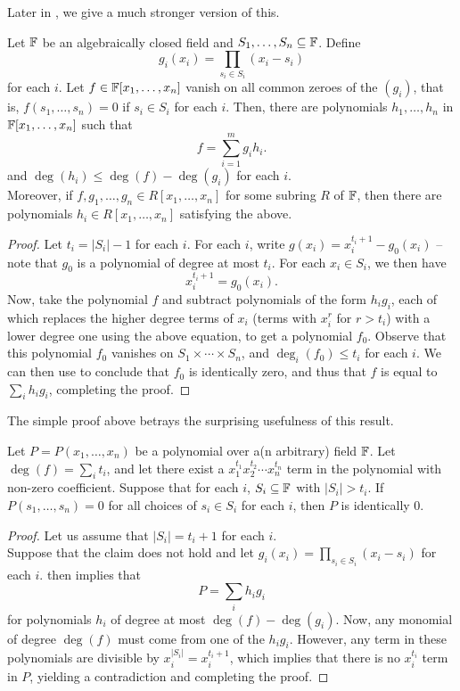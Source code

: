 	Later in , we give a much stronger version of this.

	\begin{ftheo}
		\label{thm: comb null}
		Let $\mathbb{F}$ be an algebraically closed field and $S_1,\ldots,S_n \subseteq \mathbb{F}$. Define
		\[ g_i(x_i) = \prod_{s_i \in S_i} (x_i - s_i) \]
		for each $i$. Let $f \in \mathbb{F}[x_1,\ldots,x_n]$ vanish on all common zeroes of the $(g_i)$, that is, $f(s_1,\ldots,s_n) = 0$ if $s_i \in S_i$ for each $i$. Then, there are polynomials $h_1,\ldots,h_n$ in $\mathbb{F}[x_1,\ldots,x_n]$ such that
		\[ f = \sum_{i=1}^{m} g_i h_i. \]
		and $\deg(h_i) \le \deg(f) - \deg(g_i)$ for each $i$.\\
		Moreover, if $f,g_1,\ldots,g_n \in R[x_1,\ldots,x_n]$ for some subring $R$ of $\mathbb{F}$, then there are polynomials $h_i \in R[x_1,\ldots,x_n]$ satisfying the above.
	\end{ftheo}
	\begin{proof}
		Let $t_i = |S_i| - 1$ for each $i$. For each $i$, write $g(x_i) = x_i^{t_i+1} - g_0(x_i)$ -- note that $g_0$ is a polynomial of degree at most $t_i$. For each $x_i \in S_i$, we then have
		\[ x_i^{t_i + 1} = g_0(x_i). \]
		Now, take the polynomial $f$ and subtract polynomials of the form $h_i g_i$, each of which replaces the higher degree terms of $x_i$ (terms with $x_i^{r}$ for $r > t_i$) with a lower degree one using the above equation, to get a polynomial $f_0$. Observe that this polynomial $f_0$ vanishes on $S_1 \times \cdots \times S_n$, and $\deg_i(f_0) \le t_i$ for each $i$. We can then use  to conclude that $f_0$ is identically zero, and thus that $f$ is equal to $\sum_i h_i g_i$, completing the proof.
	\end{proof}

	The simple proof above betrays the surprising usefulness of this result.

	\begin{fcor}
		\label{thm: cube-vanishing}
		Let $P = P(x_1,\ldots,x_n)$ be a polynomial over a(n arbitrary) field $\mathbb{F}$. Let $\deg(f) = \sum_i t_i$, and let there exist a $x_1^{t_1} x_2^{t_2} \cdots x_n^{t_n}$ term in the polynomial with non-zero coefficient. Suppose that for each $i$, $S_i \subseteq \mathbb{F}$ with $|S_i| > t_i$. If $P(s_1,\ldots,s_n) = 0$ for all choices of $s_i \in S_i$ for each $i$, then $P$ is identically $0$. 
	\end{fcor}
	\begin{proof}
		Let us assume that $|S_i| = t_i + 1$ for each $i$.\\
		Suppose that the claim does not hold and let $g_i(x_i) = \prod_{s_i \in S_i} (x_i - s_i)$ for each $i$.  then implies that
		\[ P = \sum_i h_i g_i \]
		for polynomials $h_i$ of degree at most $\deg(f) - \deg(g_i)$. Now, any monomial of degree $\deg(f)$ must come from one of the $h_i g_i$. However, any term in these polynomials are divisible by $x_i^{|S_i|} = x_i^{t_i + 1}$, which implies that there is no $x_i^{t_i}$ term in $P$, yielding a contradiction and completing the proof.
	\end{proof}

